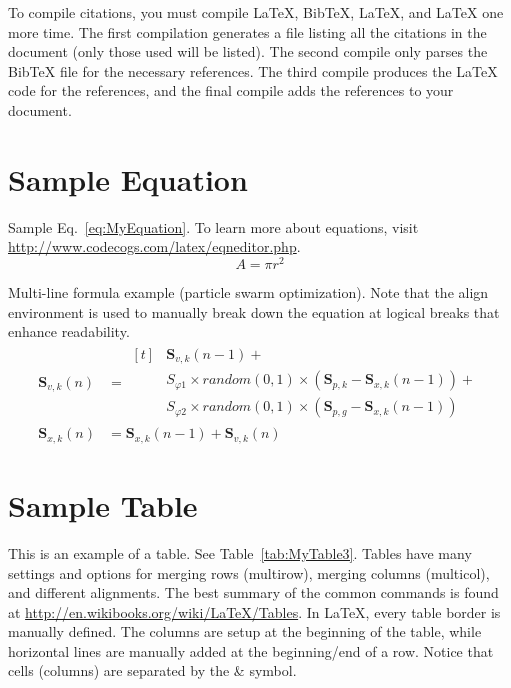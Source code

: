 To compile citations, you must compile LaTeX, BibTeX, LaTeX, and LaTeX one more time. The first compilation generates a file listing all the citations in the document (only those used will be listed). The second compile only parses the BibTeX file for the necessary references. The third compile produces the LaTeX code for the references, and the final compile adds the references to your document. 

\section{Sample Equation}
\label{sec:intro:second:equation}
Sample Eq.~\ref{eq:MyEquation}. To learn more about equations, visit \url{http://www.codecogs.com/latex/eqneditor.php}.
\begin{equation}
	A = \pi r^2
	\label{eq:MyEquation}
\end{equation}

Multi-line formula example (particle swarm optimization). Note that the align environment is used to manually break down the equation at logical breaks that enhance readability.
\begin{subequations}
	\label{eq:pso:original}
	\begin{align}
	\textbf{S}_{v,k}\left( n \right) &= \begin{aligned}[t] 
		&\textbf{S}_{v,k} \left( n-1 \right) + \\
		&S_{\varphi1} \times random(0,1) \times \left( \textbf{S}_{p,k} - \textbf{S}_{x,k} \left( n-1 \right) \right) + \\
		&S_{\varphi2} \times random(0,1) \times \left( \textbf{S}_{p,g} - \textbf{S}_{x,k} \left( n-1 \right) \right) 
		\end{aligned} \label{eq:pso:original:velocity} \\
	\textbf{S}_{x,k}\left( n \right) &= \textbf{S}_{x,k}\left( n-1 \right) + \textbf{S}_{v,k} \left( n \right) \label{eq:pso:original:position}
	\end{align}
\end{subequations}\clearpage

\section{Sample Table}
\label{sec:intro:second:table}
This is an example of a table. See Table~\ref{tab:MyTable3}. Tables have many settings and options for merging rows (multirow), merging columns (multicol), and different alignments. The best summary of the common commands is found at \url{http://en.wikibooks.org/wiki/LaTeX/Tables}. In LaTeX, every table border is manually defined. The columns are setup at the beginning of the table, while horizontal lines are manually added at the beginning/end of a row. Notice that cells (columns) are separated by the \& symbol. 

